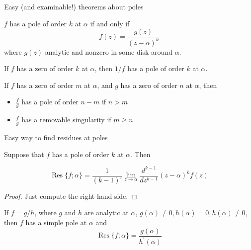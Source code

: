 \documentclass{beamer}
\DeclareMathOperator{\Res}{Res}
\begin{document}
\begin{frame}{Easy (and examinable!) theorems about poles}
\begin{theorem} $f$ has a pole of order $k$ at $\alpha$ if and only if $$f(z)=\frac{g(z)}{(z-\alpha)^k}$$ where $g(z)$ analytic and nonzero in some disk around $\alpha$.
\end{theorem}

\begin{theorem} If $f$ has a zero of order $k$ at $\alpha$, then $1/f$ has a pole of order $k$ at $\alpha$.
\end{theorem}

\begin{corollary}If $f$ has a zero of order $m$ at $\alpha$, and $g$ has a zero of order $n$ at $\alpha$, then
\begin{itemize}
    \item $\frac{f}{g}$ has a pole of order $n-m$ if $n>m$
    \item $\frac{f}{g}$ has a removable singularity if $m\geq n$
\end{itemize}
\end{corollary}
\end{frame}

\begin{frame}{Easy way to find residues at poles}
\begin{theorem}
Suppose that $f$ has a pole of order $k$ at $\alpha$.  Then

$$\Res\{f;\alpha\}=\frac{1}{(k-1)!}\lim_{z\to\alpha} \frac{d^{k-1}}{dz^{k-1}} (z-\alpha)^kf(z)$$
\end{theorem}
\begin{proof}Just compute the right hand side.
\end{proof}
\begin{corollary}
If $f=g/h$, where $g$ and $h$ are analytic at $\alpha$, $g(\alpha)\neq 0, h(\alpha)=0, h(\alpha)\neq 0$, then $f$ has a simple pole at $\alpha$ and
$$\Res\{f;\alpha\}=\frac{g(\alpha)}{h^\prime(\alpha)}$$
\end{corollary}
\end{frame}
\end{document}
